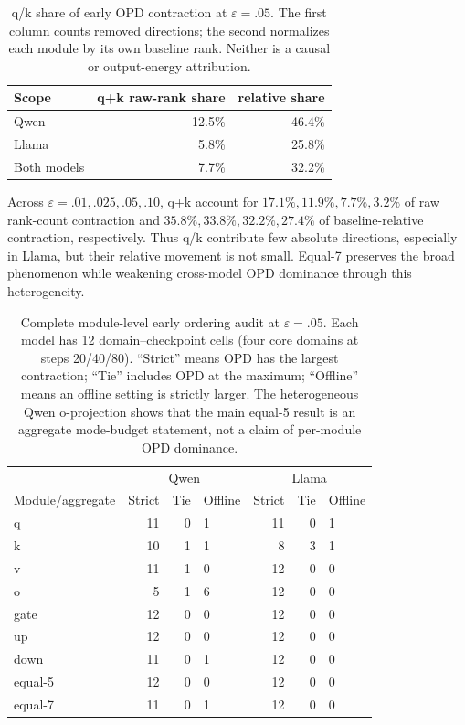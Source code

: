 \documentclass[letterpaper]{article} %
\begin{document}
\begin{table}[t]
\centering
\small
\setlength{\tabcolsep}{4pt}
\begin{tabular}{lrr}
\toprule
Scope & q+k raw-rank share & relative share \\
\midrule
Qwen & 12.5\% & 46.4\% \\
Llama & 5.8\% & 25.8\% \\
Both models & 7.7\% & 32.2\% \\
\bottomrule
\end{tabular}
\caption{q/k share of early OPD contraction at $\varepsilon=.05$. The first column
counts removed directions; the second normalizes each module by its own baseline rank.
Neither is a causal or output-energy attribution.}
\label{tab:supp-qk}
\end{table}

Across $\varepsilon=.01,.025,.05,.10$, q+k account for
$17.1\%,11.9\%,7.7\%,3.2\%$ of raw rank-count contraction and
$35.8\%,33.8\%,32.2\%,27.4\%$ of baseline-relative contraction, respectively.
Thus q/k contribute few absolute directions, especially in Llama, but their relative
movement is not small. Equal-7 preserves the broad phenomenon while weakening
cross-model OPD dominance through this heterogeneity.

\begin{table}[t]
\centering
\small
\setlength{\tabcolsep}{5pt}
\begin{tabular}{lrrlrrl}
\toprule
& \multicolumn{3}{c}{Qwen} & \multicolumn{3}{c}{Llama} \\
Module/aggregate & Strict & Tie & Offline & Strict & Tie & Offline \\
\midrule
q & 11 & 0 & 1 & 11 & 0 & 1 \\
k & 10 & 1 & 1 & 8 & 3 & 1 \\
v & 11 & 1 & 0 & 12 & 0 & 0 \\
o & 5 & 1 & 6 & 12 & 0 & 0 \\
gate & 12 & 0 & 0 & 12 & 0 & 0 \\
up & 12 & 0 & 0 & 12 & 0 & 0 \\
down & 11 & 0 & 1 & 12 & 0 & 0 \\
\midrule
equal-5 & 12 & 0 & 0 & 12 & 0 & 0 \\
equal-7 & 11 & 0 & 1 & 12 & 0 & 0 \\
\bottomrule
\end{tabular}
\caption{Complete module-level early ordering audit at $\varepsilon=.05$. Each model has
12 domain--checkpoint cells (four core domains at steps 20/40/80). ``Strict'' means OPD
has the largest contraction; ``Tie'' includes OPD at the maximum; ``Offline'' means an
offline setting is strictly larger. The heterogeneous Qwen o-projection shows that the
main equal-5 result is an aggregate mode-budget statement, not a claim of per-module
OPD dominance.}
\label{tab:supp-seven-modules}
\end{table}
\end{document}
